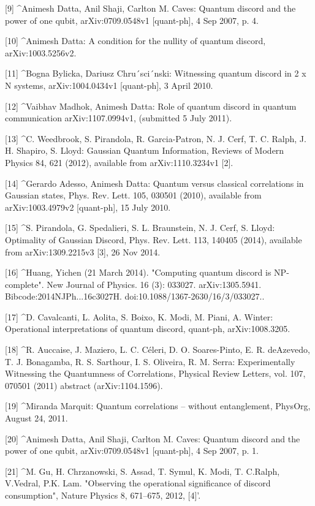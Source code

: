 [9]
^Animesh Datta, Anil Shaji, Carlton M. Caves: Quantum discord and the power of one qubit, arXiv:0709.0548v1 [quant-ph], 4 Sep 2007, p. 4.

[10]
^Animesh Datta: A condition for the nullity of quantum discord, arXiv:1003.5256v2.

[11]
^Bogna Bylicka, Dariusz Chru´sci´nski: Witnessing quantum discord in 2 x N systems, arXiv:1004.0434v1 [quant-ph], 3 April 2010.

[12]
^Vaibhav Madhok, Animesh Datta: Role of quantum discord in quantum communication arXiv:1107.0994v1, (submitted 5 July 2011).

[13]
^C. Weedbrook, S. Pirandola, R. Garcia-Patron, N. J. Cerf, T. C. Ralph, J. H. Shapiro, S. Lloyd: Gaussian Quantum Information, Reviews of Modern Physics 84, 621 (2012), available from arXiv:1110.3234v1 [2].

[14]
^Gerardo Adesso, Animesh Datta: Quantum versus classical correlations in Gaussian states, Phys. Rev. Lett. 105, 030501 (2010), available from arXiv:1003.4979v2 [quant-ph], 15 July 2010.

[15]
^S. Pirandola, G. Spedalieri, S. L. Braunstein, N. J. Cerf, S. Lloyd: Optimality of Gaussian Discord, Phys. Rev. Lett. 113, 140405 (2014), available from arXiv:1309.2215v3 [3], 26 Nov 2014.

[16]
^Huang, Yichen (21 March 2014). "Computing quantum discord is NP-complete". New Journal of Physics. 16 (3): 033027. arXiv:1305.5941. Bibcode:2014NJPh...16c3027H. doi:10.1088/1367-2630/16/3/033027..

[17]
^D. Cavalcanti, L. Aolita, S. Boixo, K. Modi, M. Piani, A. Winter: Operational interpretations of quantum discord, quant-ph, arXiv:1008.3205.

[18]
^R. Auccaise, J. Maziero, L. C. Céleri, D. O. Soares-Pinto, E. R. deAzevedo, T. J. Bonagamba, R. S. Sarthour, I. S. Oliveira, R. M. Serra: Experimentally Witnessing the Quantumness of Correlations, Physical Review Letters, vol. 107, 070501 (2011) abstract (arXiv:1104.1596).

[19]
^Miranda Marquit: Quantum correlations – without entanglement, PhysOrg, August 24, 2011.

[20]
^Animesh Datta, Anil Shaji, Carlton M. Caves: Quantum discord and the power of one qubit, arXiv:0709.0548v1 [quant-ph], 4 Sep 2007, p. 1.

[21]
^M. Gu, H. Chrzanowski, S. Assad, T. Symul, K. Modi, T. C.Ralph, V.Vedral, P.K. Lam. "Observing the operational significance of discord consumption", Nature Physics 8, 671–675, 2012, [4]'.

